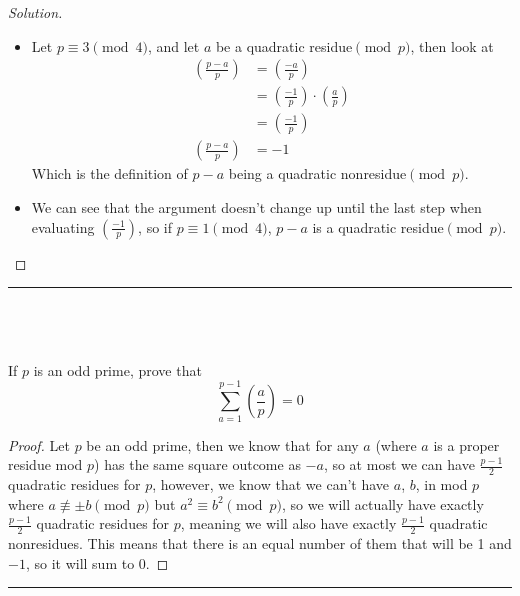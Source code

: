 \documentclass[11pt]{article}
\newcommand{\nequiv}{\not\equiv}
\newcommand\leg[2]{\left(\frac{#1}{#2}\right)}
\newenvironment{myproblem}[1][Problem]{\begin{trivlist}
    \item[\hskip \labelsep {\bfseries #1.}]}{\end{trivlist}}
\newenvironment{solution}
  {\renewcommand\qedsymbol{$~$}\begin{proof}[Solution]$ $\par\nobreak\ignorespaces}
  {\end{proof}}
\begin{document}
\begin{solution}
  \begin{itemize}
    \item [(a)] Let $p\equiv 3 \pmod{4}$, and let $a$ be a quadratic residue$\pmod{p}$, then look at
          \begin{align*}
            \leg{p-a}{p} & = \leg{-a}{p}                  \\
                         & = \leg{-1}{p} \cdot \leg{a}{p} \\
                         & = \leg{-1}{p}                  \\
            \leg{p-a}{p} & = -1
          \end{align*}
          Which is the definition of $p-a$ being a quadratic nonresidue$\pmod{p}$.
    \item [(b)] We can see that the argument doesn't change up until the last step when evaluating $\leg{-1}{p}$, so if $p\equiv 1 \pmod{4}$, $p-a$ is a quadratic residue$\pmod{p}$.
  \end{itemize}
\end{solution}

\hrule
~\newline

\section{}

\begin{myproblem}
  If $p$ is an odd prime, prove that
  \[
    \sum_{a=1}^{p-1} \leg{a}{p}= 0
  \]
\end{myproblem}

\begin{proof}
  Let $p$ be an odd prime, then we know that for any $a$ (where $a$ is a proper residue mod $p$) has the same square outcome as $-a$, so at most we can have $\frac{p-1}{2}$ quadratic residues for $p$, however, we know that we can't have $a$, $b$, in mod $p$ where $a\nequiv \pm b\pmod{p}$ but $a^2\equiv b^2\pmod{p}$, so we will actually have exactly $\frac{p-1}{2}$ quadratic residues for $p$, meaning we will also have exactly $\frac{p-1}{2}$ quadratic nonresidues. This means that there is an equal number of them that will be 1 and $-1$, so it will sum to 0.
\end{proof}



\hrule
~\newline

\section{}
\end{document}
